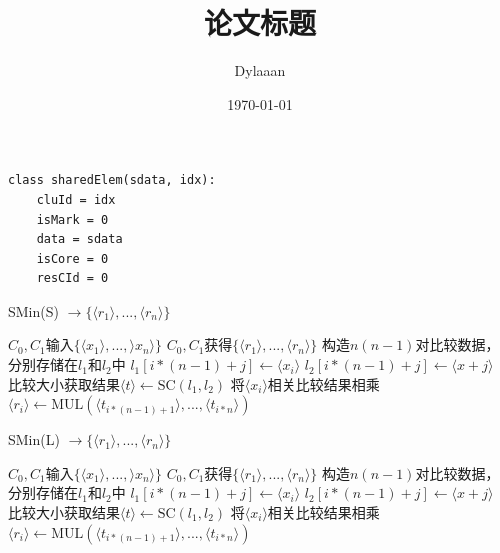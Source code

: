 \documentclass[12pt, a4paper, oneside]{ctexart}
\title{\textbf{论文标题}}
\author{Dylaaan}
\date{\today}
\begin{document}
\maketitle

\setcounter{page}{0}
\maketitle
\thispagestyle{empty}

\begin{lstlisting}[caption={Shared element},label=l1]
class sharedElem(sdata, idx):
	cluId = idx
	isMark = 0
	data = sdata
	isCore = 0
	resCId = 0
\end{lstlisting}

\begin{algorithm}[htbp]
	\renewcommand{\algorithmicrequire}{\textbf{输入:}}
	\renewcommand{\algorithmicensure}{\textbf{输出:}}
	\caption{SMin(S) $\rightarrow \{\langle r_1 \rangle,...,\langle r_n\rangle\}$}
	\label{alg_sc}
	\begin{algorithmic}[1]
		\REQUIRE $C_0,C_1$输入$ \{\langle x_1 \rangle,...,\rangle x_n\rangle\} $
		\ENSURE $C_0,C_1$获得$\{\langle r_1 \rangle,...,\langle r_n\rangle\}$
		\STATE 构造$ n(n-1) $对比较数据，分别存储在$ l_1 $和$ l_2 $中
		\STATE $ l_1[i*(n-1)+j] \leftarrow \langle x_i \rangle $
		\STATE $ l_2[i*(n-1)+j] \leftarrow \langle x+j \rangle $
		\ENDFOR
		\ENDFOR
		\STATE 比较大小获取结果$ \langle t \rangle \leftarrow \text{SC}(l_1, l_2) $
		\STATE 将$ \langle x_i\rangle $相关比较结果相乘$ \langle r_i \rangle \leftarrow \text{MUL}(\langle t_{i*(n-1)+1}\rangle,...,\langle t_{i*n} \rangle)$
		\ENDFOR
	\end{algorithmic}
\end{algorithm}

\begin{algorithm}[htbp]
	\renewcommand{\algorithmicrequire}{\textbf{输入:}}
	\renewcommand{\algorithmicensure}{\textbf{输出:}}
	\caption{SMin(L) $\rightarrow \{\langle r_1  \rangle,...,\langle r_n\rangle\}$}
	\label{alg_sminl}
	\begin{algorithmic}[1]
		\REQUIRE $C_0,C_1$输入$ \{\langle x_1 \rangle,...,\rangle x_n\rangle\} $
		\ENSURE $C_0,C_1$获得$\{\langle r_1 \rangle,...,\langle r_n\rangle\}$
		\STATE 
		\ENDFOR
		\STATE 构造$ n(n-1) $对比较数据，分别存储在$ l_1 $和$ l_2 $中
		\STATE $ l_1[i*(n-1)+j] \leftarrow \langle x_i \rangle $
		\STATE $ l_2[i*(n-1)+j] \leftarrow \langle x+j \rangle $
		\ENDFOR
		\ENDFOR
		\STATE 比较大小获取结果$ \langle t \rangle \leftarrow \text{SC}(l_1, l_2) $
		\STATE 将$ \langle x_i\rangle $相关比较结果相乘$ \langle r_i \rangle \leftarrow \text{MUL}(\langle t_{i*(n-1)+1}\rangle,...,\langle t_{i*n} \rangle)$
		\ENDFOR
	\end{algorithmic}
\end{algorithm}
\end{document}

